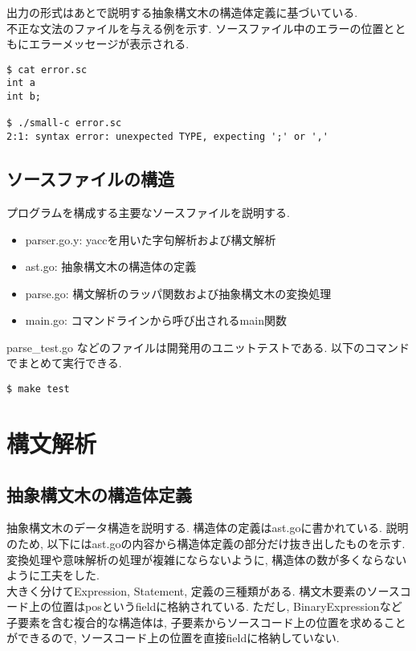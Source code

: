 \documentclass[a4j]{jarticle}
\begin{document}
出力の形式はあとで説明する抽象構文木の構造体定義に基づいている. \\

不正な文法のファイルを与える例を示す. ソースファイル中のエラーの位置とともにエラーメッセージが表示される.

\begin{verbatim}
$ cat error.sc
int a
int b;

$ ./small-c error.sc
2:1: syntax error: unexpected TYPE, expecting ';' or ','
\end{verbatim}

\subsection{ソースファイルの構造}
プログラムを構成する主要なソースファイルを説明する.

\begin{itemize}
\item parser.go.y: yaccを用いた字句解析および構文解析
\item ast.go: 抽象構文木の構造体の定義
\item parse.go: 構文解析のラッパ関数および抽象構文木の変換処理
\item main.go: コマンドラインから呼び出されるmain関数
\end{itemize}

parse\_test.go などのファイルは開発用のユニットテストである. 以下のコマンドでまとめて実行できる.

\begin{verbatim}
$ make test
\end{verbatim}

\section{構文解析}
\subsection{抽象構文木の構造体定義}
抽象構文木のデータ構造を説明する. 構造体の定義はast.goに書かれている. 説明のため, 以下にはast.goの内容から構造体定義の部分だけ抜き出したものを示す. \\

変換処理や意味解析の処理が複雑にならないように, 構造体の数が多くならないように工夫をした. \\

大きく分けてExpression, Statement, 定義の三種類がある. 構文木要素のソースコード上の位置はposというfieldに格納されている. ただし, BinaryExpressionなど子要素を含む複合的な構造体は, 子要素からソースコード上の位置を求めることができるので, ソースコード上の位置を直接fieldに格納していない.
\end{document}
